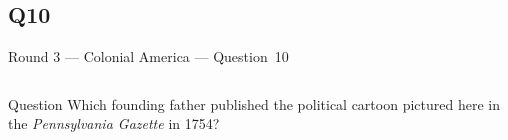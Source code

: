 \documentclass[11pt]{beamer}
\begin{document}
\subsection*{Q10}
\begin{frame}[t]{Round 3 --- Colonial America --- \mbox{Question 10}}
\vspace{-0.5em}
\begin{columns}[T,totalwidth=\linewidth]
\begin{column}{0.32\linewidth}
\begin{block}{Question}
Which founding father published the political cartoon pictured here in the \emph{Pennsylvania Gazette} in 1754?
\end{block}
\end{column}
\begin{column}{0.65\linewidth}
\begin{center}
\texttt{[image: \{Images/joinordie]}.jpg}
\end{center}
\end{column}
\end{columns}
\end{frame}
\end{document}
